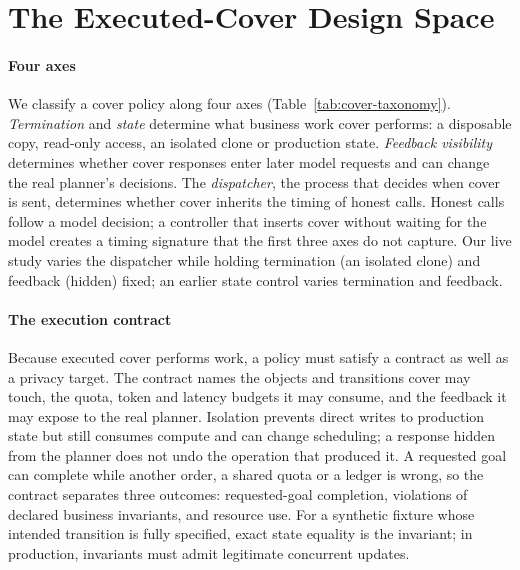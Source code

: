 \section{The Executed-Cover Design Space}\label{sec:design}
\paragraph{Four axes}
We classify a cover policy along four axes (Table~\ref{tab:cover-taxonomy}). \emph{Termination} and \emph{state} determine what business work cover performs: a disposable copy, read-only access, an isolated clone or production state. \emph{Feedback visibility} determines whether cover responses enter later model requests and can change the real planner's decisions. The \emph{dispatcher}, the process that decides when cover is sent, determines whether cover inherits the timing of honest calls. Honest calls follow a model decision; a controller that inserts cover without waiting for the model creates a timing signature that the first three axes do not capture. Our live study varies the dispatcher while holding termination (an isolated clone) and feedback (hidden) fixed; an earlier state control varies termination and feedback.



\paragraph{The execution contract}
Because executed cover performs work, a policy must satisfy a contract as well as a privacy target. The contract names the objects and transitions cover may touch, the quota, token and latency budgets it may consume, and the feedback it may expose to the real planner. Isolation prevents direct writes to production state but still consumes compute and can change scheduling; a response hidden from the planner does not undo the operation that produced it. A requested goal can complete while another order, a shared quota or a ledger is wrong, so the contract separates three outcomes: requested-goal completion, violations of declared business invariants, and resource use. For a synthetic fixture whose intended transition is fully specified, exact state equality is the invariant; in production, invariants must admit legitimate concurrent updates.

